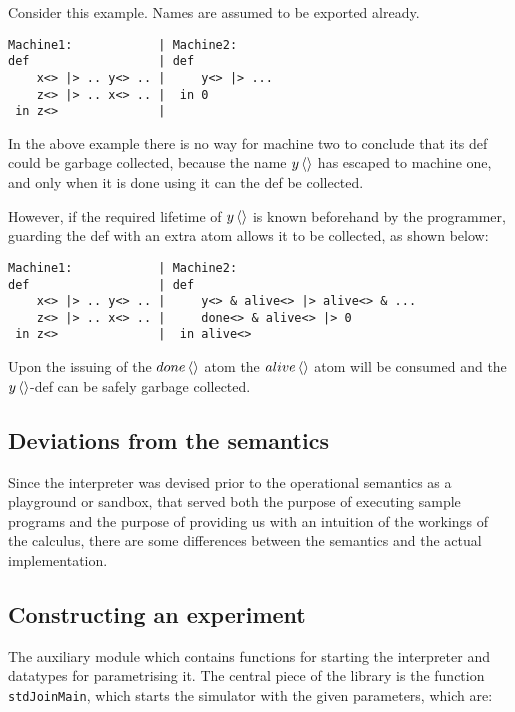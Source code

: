 Consider this example. Names are assumed to be exported already.
\begin{verbatim}
Machine1:            | Machine2:
def                  | def
    x<> |> .. y<> .. |     y<> |> ...
    z<> |> .. x<> .. |  in 0
 in z<>              |
\end{verbatim}

In the above example there is no way for machine two to conclude that its def
could be garbage collected, because the name $\atm y<>$ has escaped to machine
one, and only when it is done using it can the def be collected.

However, if the required lifetime of $\atm y<>$ is known beforehand by the
programmer, guarding the def with an extra atom allows it to be collected, as
shown below:
\begin{verbatim}
Machine1:            | Machine2:
def                  | def
    x<> |> .. y<> .. |     y<> & alive<> |> alive<> & ...
    z<> |> .. x<> .. |     done<> & alive<> |> 0
 in z<>              |  in alive<>
\end{verbatim}

Upon the issuing of the $\atm done<>$ atom the $\atm alive<>$ atom will be
consumed and the $\atm y<>$-def can be safely garbage collected.

\subsection*{Deviations from the semantics}
Since the interpreter was devised prior to the operational semantics as a
playground or sandbox, that served both the purpose of executing sample programs
and the purpose of providing us with an intuition of the workings of the
calculus, there are some differences between the semantics and the actual
implementation.

\subsection{Constructing an experiment}
The auxiliary module which contains functions for
starting the interpreter and datatypes for parametrising it. The central piece
of the library is the function \texttt{stdJoinMain}, which starts the simulator
with the given parameters, which are:

